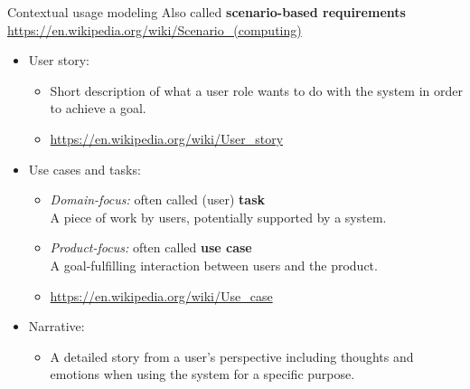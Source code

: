 \begin{Slide}{Contextual usage modeling}
Also called \textbf{scenario-based requirements} 
{\footnotesize\url{https://en.wikipedia.org/wiki/Scenario_(computing)}}
\begin{itemize}
\item User story:
\begin{itemize}
\item Short description of what a user role wants to do with the system in order to achieve a goal.
\item {\footnotesize\url{https://en.wikipedia.org/wiki/User_story}}
\end{itemize}
\item Use cases and tasks: 
\begin{itemize}
\item \textit{Domain-focus:} often called (user) \textbf{task}\\
    A piece of work by users, potentially supported by a system.
\item \textit{Product-focus:} often called \textbf{use case}\\
    A goal-fulfilling interaction between users and the product.
\item {\footnotesize\url{https://en.wikipedia.org/wiki/Use_case}}
\end{itemize}
\item Narrative:
\begin{itemize}
\item A detailed story from a user's perspective including thoughts and emotions when using the system for a specific purpose.



\end{itemize}
\end{itemize}
\end{Slide}